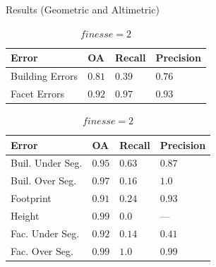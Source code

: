 \documentclass{beamer}
\begin{document}
        \begin{frame}[plain]{Results (Geometric and Altimetric)}
            \begin{table}
                \begin{subtable}{.4\textwidth}
                    \tiny
                    \begin{center}
                        \begin{tabular}{x{1cm} x{.5cm} x{.5cm} x{.5cm}}
                            \toprule
                            {\bf Error} & {\bf OA} & {\bf Recall} & {\bf Precision} \\
                            \midrule
                            Building Errors & $0.81$ & $0.39$ & $0.76$ \\
                            \midrule
                            Facet Errors & $0.92$ & $0.97$ & $0.93$ \\
                            \bottomrule
                        \end{tabular}
                        \caption{\tiny\label{tab::finesse2} $finesse = 2$}
                    \end{center}
                \end{subtable}
                \begin{subtable}{.45\textwidth}
                    \tiny
                    \begin{center}
                        \begin{tabular}{x{1.75cm} x{.5cm} x{.5cm} x{.5cm}}
                            \toprule
                            {\bf Error} & {\bf OA} & {\bf Recall} & {\bf Precision} \\
                            \midrule
                            Buil. Under Seg. & $0.95$ & $0.63$ & $0.87$ \\
                            \midrule
                            Buil. Over Seg. & $0.97$ & $0.16$ & $1.0$ \\
                            \midrule
                            Footprint & $0.91$ & $0.24$ & $0.93$ \\
                            \midrule
                            Height & $0.99$ & $0.0$ & --- \\
                            \midrule
                            \midrule
                            Fac. Under Seg. & $0.92$ & $0.14$ & $0.41$ \\
                            \midrule
                            Fac. Over Seg. & $0.99$ & $1.0$ & $0.99$ \\

\end{tabular}
\end{center}
\end{subtable}
\end{table}
\end{frame}
\end{document}

